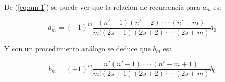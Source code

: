 \documentclass[a4paper, 12pt]{article} %
\begin{document}
De (\ref{eq:am-1}) se puede ver que la relacion de recurrencia para $a_m$ es:

\begin{equation}
a_m = (-1)^m \dfrac{(n'-1)(n'-2)\cdot\cdot\cdot(n'-m)}{m!(2s+1)(2s+2)\cdot\cdot\cdot(2s+m)}a_0
\end{equation} 

Y con un procedimiento an\'alogo se deduce que $b_m$ es:
 
\begin{equation}
b_m = (-1)^m \dfrac{n'(n'-1)\cdot\cdot\cdot (n'-m +1)}{m!(2s+1)(2s+2)\cdot\cdot\cdot(2s+m)}b_0
\end{equation}






\end{document}
